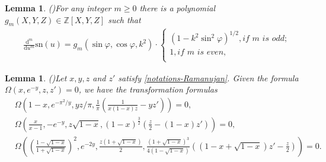 \documentclass[11pt]{article}
\theoremstyle{plain}
\newtheorem{lem}[thm]{Lemma}
\theoremstyle{definition}
\begin{document}
\begin{lem}\emph{(\cite[Lem. 7.3.]{XZ2023})}\label{Taylor sn}
	For any integer $m\ge 0$ there is a polynomial $g_m(X,Y,Z)\in \mathbb{Z}[X,Y,Z]$ such that 	\begin{align}
&	\frac{\mathrm{d}^m}{\mathrm{d}u^m}\mathrm{sn}\left( u \right) =g_m\left( \sin \varphi ,\cos \varphi ,k^2 \right) \cdot \begin{cases}
		\left( 1-k^2\sin ^2\varphi \right) ^{1/2}, if\,\,m\,\,is\,\,odd;\\
		1,     if\,\,m\,\,is\,\,even,\\
	\end{cases}
\end{align}
	
				\end{lem}
	\begin{lem}\emph{(\cite[Thm. 2.4]{XuZhao-2024})}\label{lem-2,transform}
	Let $x, y, z$ and $z'$ satisfy \eqref{notations-Ramanujan}. Given the formula $\Omega(x,e^{-y},z,z')=0$, we have the transformation formulas
		\begin{align}\label{lem-for-one}
	&\Omega \left( 1-x,e^{-\pi ^2/y},yz/\pi ,\frac{1}{\pi}\left( \frac{1}{x\left( 1-x \right) z}-yz' \right) \right) =0,
	\\
	&\Omega \left( \frac{x}{x-1},-e^{-y},z\sqrt{1-x},\left( 1-x \right) ^{\tfrac{3}{2}}\left( \frac{z}{2}-\left( 1-x \right) z' \right) \right) =0,
	\\
	&\Omega \left( \left( \frac{1-\sqrt{1-x}}{1+\sqrt{1-x}} \right) ^2,e^{-2y},\frac{z\left( 1+\sqrt{1-x} \right)}{2},\frac{\left( 1+\sqrt{1-x} \right) ^3}{4\left( 1-\sqrt{1-x} \right)}\left( \left( 1-x+\sqrt{1-x} \right)z'-\frac{z}{2} \right) \right) =0.\label{lem-for-trans-3}
		\end{align}
	\end{lem}
\end{document}
